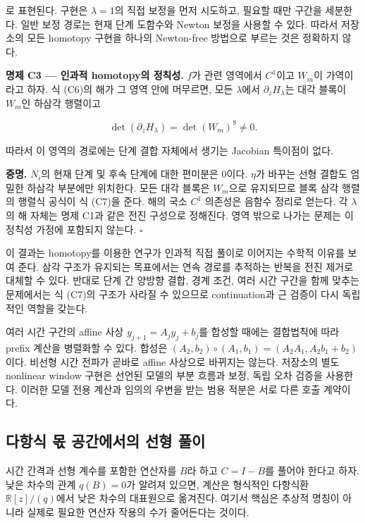 \documentclass[
  10pt,
  dvipsnames]{article}
\begin{document}
로 표현된다. 구현은 \(\lambda=1\)의 직접 보정을 먼저 시도하고, 필요할
때만 구간을 세분한다. 일반 보정 경로는 현재 단계 도함수와 Newton 보정을
사용할 수 있다. 따라서 저장소의 모든 homotopy 구현을 하나의 Newton-free
방법으로 부르는 것은 정확하지 않다.

\textbf{명제 C3 --- 인과적 homotopy의 정칙성.} \(f\)가 관련 영역에서
\(C^1\)이고 \(W_m\)이 가역이라고 하자. 식 (C6)의 해가 그 영역 안에
머무르면, 모든 \(\lambda\)에서 \(\partial_zH_\lambda\)는 대각 블록이
\(W_m\)인 하삼각 행렬이고

\[
 \det(\partial_zH_\lambda)=\det(W_m)^8\ne0.
 \tag{C7}
\]

따라서 이 영역의 경로에는 단계 결합 자체에서 생기는 Jacobian 특이점이
없다.

\textbf{증명.} \(N_i\)의 현재 단계 및 후속 단계에 대한 편미분은 0이다.
\(\eta\)가 바꾸는 선형 결합도 엄밀한 하삼각 부분에만 위치한다. 모든 대각
블록은 \(W_m\)으로 유지되므로 블록 삼각 행렬의 행렬식 공식이 식 (C7)을
준다. 해의 국소 \(C^1\) 의존성은 음함수 정리로 얻는다. 각 \(\lambda\)의
해 자체는 명제 C1과 같은 전진 구성으로 정해진다. 영역 밖으로 나가는
문제는 이 정칙성 가정에 포함되지 않는다. \(\square\)

이 결과는 homotopy를 이용한 연구가 인과적 직접 풀이로 이어지는 수학적
이유를 보여 준다. 삼각 구조가 유지되는 목표에서는 연속 경로를 추적하는
반복을 전진 제거로 대체할 수 있다. 반대로 단계 간 양방향 결합, 경계
조건, 여러 시간 구간을 함께 맞추는 문제에서는 식 (C7)의 구조가 사라질 수
있으므로 continuation과 근 검증이 다시 독립적인 역할을 갖는다.

여러 시간 구간의 affine 사상 \(y_{j+1}=A_jy_j+b_j\)를 합성할 때에는
결합법칙에 따라 prefix 계산을 병렬화할 수 있다. 합성은
\((A_2,b_2)\circ(A_1,b_1)=(A_2A_1,A_2b_1+b_2)\)이다. 비선형 시간 전파가
곧바로 affine 사상으로 바뀌지는 않는다. 저장소의 별도 nonlinear window
구현은 선언된 모델의 부분 흐름과 보정, 독립 오차 검증을 사용한다. 이러한
모델 전용 계산과 임의의 우변을 받는 범용 적분은 서로 다른 호출 계약이다.

\hypertarget{uxb2e4uxd56duxc2dd-uxbaab-uxacf5uxac04uxc5d0uxc11cuxc758-uxc120uxd615-uxd480uxc774}{%
\subsection{다항식 몫 공간에서의 선형
풀이}\label{uxb2e4uxd56duxc2dd-uxbaab-uxacf5uxac04uxc5d0uxc11cuxc758-uxc120uxd615-uxd480uxc774}}

시간 간격과 선형 계수를 포함한 연산자를 \(B\)라 하고 \(C=I-B\)를 풀어야
한다고 하자. 낮은 차수의 관계 \(q(B)=0\)가 알려져 있으면, 계산은
형식적인 다항식환 \(\mathbb R[z]/(q)\)에서 낮은 차수의 대표원으로
옮겨진다. 여기서 핵심은 추상적 명칭이 아니라 실제로 필요한 연산자 작용의
수가 줄어든다는 것이다.
\end{document}
